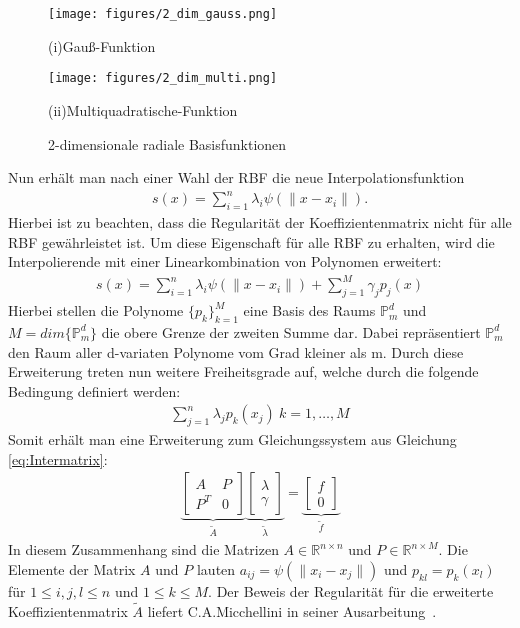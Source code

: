 \documentclass[12pt,titlepage]{article}
\begin{document}
\begin{figure}[H]
	\centering
\hspace{-1.5cm}
\begin{minipage}{0.45\textwidth}
	\texttt{[image: figures/2\_dim\_gauss.png]}
	\caption*{(i)Gauß-Funktion}
\end{minipage}
\hspace{0.6cm}
\begin{minipage}{0.45\textwidth}
	\texttt{[image: figures/2\_dim\_multi.png]}
	\caption*{(ii)Multiquadratische-Funktion}
\end{minipage}
	\caption{2-dimensionale radiale Basisfunktionen}
	\label{fig:RBF_2dim}
\end{figure}
\noindent
Nun erhält man nach einer Wahl der RBF die neue Interpolationsfunktion
\begin{align}
 s(x)=\sum_{i=1}^n\lambda_i\psi(\|x-x_i\|).
\end{align}
Hierbei ist zu beachten, dass die Regularität der Koeffizientenmatrix nicht für alle RBF gewährleistet ist. Um diese Eigenschaft für alle RBF zu erhalten, wird die Interpolierende mit einer Linearkombination von Polynomen erweitert:
\begin{align}
 s(x)=\sum_{i=1}^n\lambda_i\psi(\|x-x_i\|)+\sum_{j=1}^M\gamma_jp_j(x)
\end{align}
Hierbei stellen die Polynome $\{p_k\}_{k=1}^M$ eine Basis des Raums $\mathbb{P}_m^d$ und $M=dim\{\mathbb{P}_m^d\}$ die obere Grenze der zweiten Summe dar. Dabei repräsentiert $\mathbb{P}_m^d$ den Raum aller d-variaten Polynome vom Grad kleiner als m. Durch diese Erweiterung treten nun weitere Freiheitsgrade auf, welche durch die folgende Bedingung definiert werden:
\begin{align}
 \sum_{j=1}^n\lambda_jp_k(x_j)~k=1,\dots,M
\end{align}
Somit erhält man eine Erweiterung zum Gleichungssystem aus Gleichung \eqref{eq:Intermatrix}:
\begin{align}
\underbrace{\begin{bmatrix}
 A & P \\ P^T & 0
\end{bmatrix}}_{\tilde A}
\underbrace{\begin{bmatrix}
 \lambda  \\ \gamma
\end{bmatrix}}_{\tilde\lambda}
=
\underbrace{\begin{bmatrix}
 f  \\ 0
\end{bmatrix}}_{\tilde f}\label{eq:Inter}
\end{align}
In diesem Zusammenhang sind die Matrizen $A\in\mathbb{R}^{n\times n}$ und $P\in\mathbb{R}^{n\times M}$. Die Elemente der Matrix $A$ und $P$ lauten $a_{ij}=\psi(\|x_i-x_j\|)$ und $p_{kl}=p_k(x_l)$ für $1\le i,j,l\le n$ und $1\le k\le M$. Der Beweis der Regularität für die erweiterte Koeffizientenmatrix $\tilde A$ liefert C.A.Micchellini in seiner Ausarbeitung~\cite{micchelli1984interpolation}.
\end{document}
